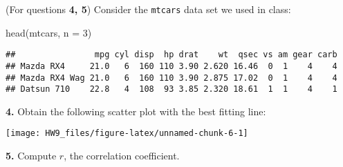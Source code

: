 \documentclass[
]{article}
\newenvironment{Shaded}{\begin{snugshade}}{\end{snugshade}}
\newcommand{\AttributeTok}[1]{\textcolor[rgb]{0.77,0.63,0.00}{#1}}
\newcommand{\DecValTok}[1]{\textcolor[rgb]{0.00,0.00,0.81}{#1}}
\newcommand{\FunctionTok}[1]{\textcolor[rgb]{0.00,0.00,0.00}{#1}}
\newcommand{\NormalTok}[1]{#1}
\begin{document}
\bigskip

(For questions \textbf{4, 5}) Consider the \texttt{mtcars} data set we
used in class:

\begin{Shaded}
\begin{Highlighting}[]
\FunctionTok{head}\NormalTok{(mtcars, }\AttributeTok{n =} \DecValTok{3}\NormalTok{)}
\end{Highlighting}
\end{Shaded}

\begin{verbatim}
##                mpg cyl disp  hp drat    wt  qsec vs am gear carb
## Mazda RX4     21.0   6  160 110 3.90 2.620 16.46  0  1    4    4
## Mazda RX4 Wag 21.0   6  160 110 3.90 2.875 17.02  0  1    4    4
## Datsun 710    22.8   4  108  93 3.85 2.320 18.61  1  1    4    1
\end{verbatim}

\textbf{4.} Obtain the following scatter plot with the best fitting
line:

\begin{center}\texttt{[image: HW9\_files/figure-latex/unnamed-chunk-6-1]} \end{center}

\textbf{5.} Compute \(r\), the correlation coefficient.
\end{document}
